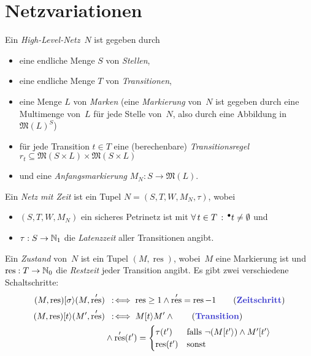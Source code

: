 \documentclass{cheat-sheet}
\newcommand{\preset}[1]{{}^\bullet{#1}} %
\newcommand{\activeTransition}[1]{[{#1}\rangle} %
\newcommand{\Multisets}{\mathfrak{M}} %
\DeclareMathOperator{\resTime}{res} %
\begin{document}
\section{Netzvariationen}


\begin{defn}
  Ein \emph{High-Level-Netz}~$N$ ist gegeben durch
  \begin{itemize}
    \item eine endliche Menge $S$ von \textit{Stellen},
    \item eine endliche Menge $T$ von \textit{Transitionen},
    \item eine Menge $L$ von \textit{Marken} (eine \textit{Markierung} von~$N$ ist gegeben durch eine Multimenge von~$L$ für jede Stelle von~$N$, also durch eine Abbildung in $\Multisets(L)^S$)
    \item für jede Transition $t \in T$ eine (berechenbare) \textit{Transitionsregel} $r_t \subseteq \Multisets(S \times L) \times \Multisets(S \times L)$
    \item und eine \textit{Anfangsmarkierung} $M_N : S \to \Multisets(L)$.
  \end{itemize}
\end{defn}


\begin{defn}
  Ein \emph{Netz mit Zeit} ist ein Tupel $N = (S, T, W, M_N, \tau)$, wobei
  \begin{itemize}
    \item $(S, T, W, M_N)$ ein sicheres Petrinetz ist mit $\fa{t \in T} \preset{t} \neq \emptyset$ und
    \item $\tau : S \to \mathbb{N}_1$ die \emph{Latenzzeit} aller Transitionen angibt.
  \end{itemize}
  Ein \emph{Zustand} von~$N$ ist ein Tupel $(M, \resTime)$, wobei~$M$ eine Markierung ist und $\resTime : T \to \N_0$ die \textit{Restzeit} jeder Transition angibt.
  Es gibt zwei verschiedene Schaltschritte:
  \begin{align*}
    (M, \resTime) \activeTransition{\sigma} (M, \resTime') & \coloniff
    \resTime \geq 1 \wedge \resTime' = \resTime - 1 \tag{\emph{Zeitschritt}} \\
    (M, \resTime) \activeTransition{t} (M', \resTime') & \coloniff
    M \activeTransition{t} M' \wedge \tag{\emph{Transition}} \\
    & \wedge \resTime'(t') = \begin{cases}
      \tau(t') & \text{falls $\neg (M \activeTransition{t'}) \wedge M' \activeTransition{t'}$} \\
      \resTime(t') & \text{sonst}
    \end{cases}
  \end{align*}
\end{defn}
\end{document}
